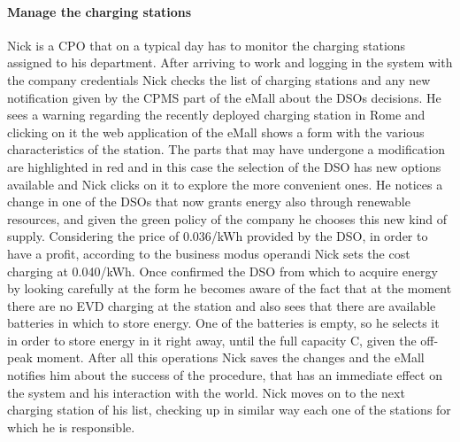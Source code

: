 \paragraph{Manage the charging stations}
Nick is a CPO that on a typical day has to monitor the charging stations assigned to his department. After arriving to work and logging in the system with the company credentials Nick checks the list of charging stations and any new notification given by the CPMS part of the eMall about the DSOs decisions. He sees a warning regarding the recently deployed charging station in Rome and clicking on it the web application of the eMall shows a form with the various characteristics of the station. The parts that may have undergone a modification are highlighted in red and in this case the selection of the DSO has new options available and Nick clicks on it to explore the more convenient ones. He notices a change in one of the DSOs that now grants energy also through renewable resources, and given the green policy of the company he chooses this new kind of supply. Considering the price of 0.036/kWh provided by the DSO, in order to have a profit, according to the business modus operandi Nick sets the cost charging at 0.040/kWh. Once confirmed the DSO from which to acquire energy by looking carefully at the form he becomes aware of the fact that at the moment there are no EVD charging at the station and also sees that there are available batteries in which to store energy. One of the batteries is empty, so he selects it in order to store energy in it right away, until the full capacity C, given the off-peak moment. After all this operations Nick saves the changes and the eMall notifies him about the success of the procedure, that has an immediate effect on the system and his interaction with the world. Nick moves on to the next charging station of his list, checking up in similar way each one of the stations for which he is responsible. 

